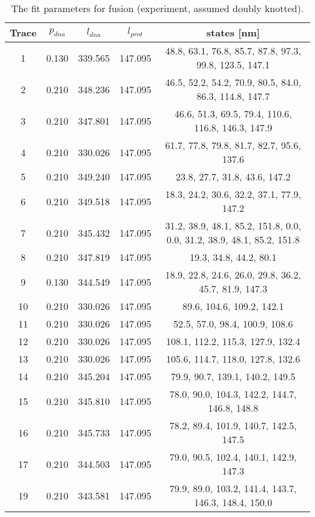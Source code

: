 \begin{table}
    \tiny
    \centering
    \caption{The fit parameters for fusion (experiment, assumed doubly knotted).}
    \label{tab:fusion-fit-parameters-exp-doubly}
    \begin{tabular}{c|c|c|c|c}
        \textbf{Trace} & $p_{dna}$ & $l_{dna}$ & $l_{prot}$ & states [nm]\\\hline
        1 & 0.130 & 339.565 & 147.095 & 48.8, 63.1, 76.8, 85.7, 87.8, 97.3, 99.8, 123.5, 147.1\\
        2 & 0.210 & 348.236 & 147.095 & 46.5, 52.2, 54.2, 70.9, 80.5, 84.0, 86.3, 114.8, 147.7\\
        3 & 0.210 & 347.801 & 147.095 & 46.6, 51.3, 69.5, 79.4, 110.6, 116.8, 146.3, 147.9\\
        4 & 0.210 & 330.026 & 147.095 & 61.7, 77.8, 79.8, 81.7, 82.7, 95.6, 137.6\\
        5 & 0.210 & 349.240 & 147.095 & 23.8, 27.7, 31.8, 43.6, 147.2\\
        6 & 0.210 & 349.518 & 147.095 & 18.3, 24.2, 30.6, 32.2, 37.1, 77.9, 147.2\\
        7 & 0.210 & 345.432 & 147.095 & 31.2, 38.9, 48.1, 85.2, 151.8, 0.0, 0.0, 31.2, 38.9, 48.1, 85.2, 151.8\\
        8 & 0.210 & 347.819 & 147.095 & 19.3, 34.8, 44.2, 80.1\\
        9 & 0.130 & 344.549 & 147.095 & 18.9, 22.8, 24.6, 26.0, 29.8, 36.2, 45.7, 81.9, 147.3\\
        10 & 0.210 & 330.026 & 147.095 & 89.6, 104.6, 109.2, 142.1\\
        11 & 0.210 & 330.026 & 147.095 & 52.5, 57.0, 98.4, 100.9, 108.6\\
        12 & 0.210 & 330.026 & 147.095 & 108.1, 112.2, 115.3, 127.9, 132.4\\
        13 & 0.210 & 330.026 & 147.095 & 105.6, 114.7, 118.0, 127.8, 132.6\\
        14 & 0.210 & 345.204 & 147.095 & 79.9, 90.7, 139.1, 140.2, 149.5\\
        15 & 0.210 & 345.810 & 147.095 & 78.0, 90.0, 104.3, 142.2, 144.7, 146.8, 148.8\\
        16 & 0.210 & 345.733 & 147.095 & 78.2, 89.4, 101.9, 140.7, 142.5, 147.5\\
        17 & 0.210 & 344.503 & 147.095 & 79.0, 90.5, 102.4, 140.1, 142.9, 147.3\\
        19 & 0.210 & 343.581 & 147.095 & 79.9, 89.0, 103.2, 141.4, 143.7, 146.3, 148.4, 150.0\\
    \end{tabular}
\end{table}